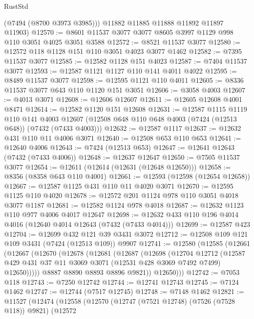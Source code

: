 \begin{lexlean}{RustStd}
\begin{coremodule}
{\begin{coremodule}
{{{{{{{{{{{{{{{{{{{{{{{{{{{{{{{{        (@7494 (@8700 @3973 @3985)))
      @11882
      @11885
      @11888
      @11892
      @11897
      @11903)
@12570 := @8601 @11537 @3077 @3077 @8605 @3997 @1129 @998 @110 @3051 @4025 @3051 @3588
@12572 := @8521 @11537 @3077
@12580 := @12572 @118 @1128 @151 @110 @3051 @4023 @3077 @1462
@12582 := @7395 @11537 @3077
@12585 := @12582 @1128 @151 @4023
@12587 := @7404 @11537 @3077
@12593 := @12587 @1121 @1127 @110 @141 @4011 @4022
@12595 := @8489 @11537 @3077
@12598 := @12595 @1121 @110 @4011
@12605 := @8336 @11537 @3077 @643 @110 @1120 @151 @3051
@12606 := @3058 @4003
@12607 := @4013 @3071
@12608 := @12606 @12607
@12611 := @12605 @12608 @4001 @8471
@12614 := @12582 @1120 @151 @12608
@12631 := @12587
    @1115
    @1119
    @110
    @141
    @4003
    @12607
    (@12508 @648 @110 @648 @4003 (@7424 (@12513 @648)) (@7432 (@7433 @4003)))
@12632 := @12587 @1117
@12637 := @12632 @431 @110 @11 @4006 @3071
@12640 := @12508 @653 @110 @653
@12641 := @12640 @4006
@12643 := @7424 (@12513 @653)
@12647 := @12641 @12643 (@7432 (@7433 @4006))
@12648 := @12637 @12647
@12650 := @7505 @11537 @3077
@12654 := @12611 (@12614 (@12631 (@12648 @12650)))
@12658 := @8356 (@8358 @643 @110 @4001)
@12661 := @12593 (@12598 (@12654 @12658))
@12667 := @12587 @1125 @431 @110 @11 @4020 @3071
@12670 := @12595 @1125 @110 @4020
@12678 := @12572 @201 @1124 @978 @110 @3051 @4018 @3077 @1187
@12681 := @12582 @1124 @978 @4018
@12687 := @12632 @1123 @110 @977 @4006 @4017 @12647
@12698 := @12632 @433 @110 @196 @4014 @4016 (@12640 @4014 @12643 (@7432 (@7433 @4014)))
@12699 := @12587 @423
@12704 := @12699 @432 @121 @39 @3431 @3072
@12712 := @12508 @109 @121 @109 @3431 (@7424 (@12513 @109)) @9907
@12741 := @12580
    (@12585
      (@12661
        (@12667
          (@12670
            (@12678
              (@12681
                (@12687
                  (@12698
                    (@12704
                      @12712
                      (@12587
                        @429
                        @431
                        @37
                        @11
                        @3069
                        @3071
                        (@12531 @428 @3069 @7492 @7499)
                        @12650)))))
              @8887
              @8890
              @8893
              @8896
              @9821))
          @12650)))
@12742 := @7053 @118
@12743 := @7250 @12742
@12744 := @12741 @12743
@12745 := @7124 @1462
@12747 := @12744 (@7517 @12745)
@12748 := @7148 @1462
@12821 := @11527
    (@12474
      (@12558
        (@12570
          (@12747 (@7521 @12748) (@7526 (@7528 @118)) @9821)
          (@12572
}}}}}}}}}}}}}}}}}}}}}}}}}}}}}}}}
\end{coremodule}}
\end{coremodule}
\end{lexlean}
